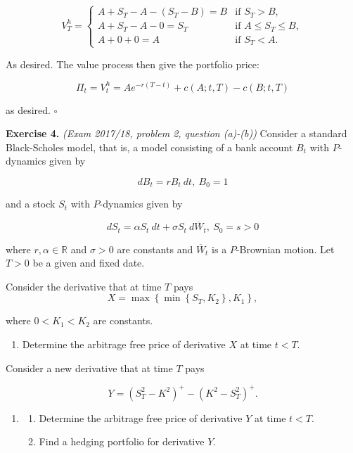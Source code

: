 \documentclass[
]{book}
\providecommand{\tightlist}{%
  \setlength{\itemsep}{0pt}\setlength{\parskip}{0pt}}
\begin{document}
\[
V_T^h=
\begin{cases}
  A+S_T-A-(S_T-B)=B & \text{if }S_T>B,\\
  A + S_T - A-0=S_T& \text{if }A\le S_T\le B,\\
  A+0+0=A &\text{if }S_T< A.
\end{cases}
\]

As desired. The value process then give the portfolio price:

\[
\Pi_t=V_t^h=Ae^{-r(T-t)}+c(A;t,T)-c(B;t,T)
\]

as desired. \(\square\)

\textbf{Exercise 4.} \emph{(Exam 2017/18, problem 2, question (a)-(b))} Consider a standard Black-Scholes model, that is, a model consisting of a bank account \(B_t\) with \(P\)-dynamics given by

\[
dB_t=rB_t\ dt,\ B_0=1
\]

and a stock \(S_t\) with \(P\)-dynamics given by

\[
dS_t=\alpha S_t\ dt+\sigma S_t\ d\overline{W}_t,\ S_0=s>0
\]

where \(r,\alpha\in\mathbb{R}\) and \(\sigma >0\) are constants and \(\overline{W}_t\) is a \(P\)-Brownian motion. Let \(T>0\) be a given and fixed date.

Consider the derivative that at time \(T\) pays
\[
X=\max\left\{\min\left\{S_T,K_2\right\},K_1\right\},
\]

where \(0<K_1<K_2\) are constants.

\begin{enumerate}
\def\labelenumi{\alph{enumi}.}
\tightlist
\item
  Determine the arbitrage free price of derivative \(X\) at time \(t<T\).
\end{enumerate}

Consider a new derivative that at time \(T\) pays

\[
Y=(S^2_T-K^2)^+-(K^2-S^2_T)^+.
\]

\begin{enumerate}
\def\labelenumi{\alph{enumi}.}
\setcounter{enumi}{1}
\item
  \begin{enumerate}
  \def\labelenumii{\roman{enumii}.}
  \tightlist
  \item
    Determine the arbitrage free price of derivative \(Y\) at time \(t<T\).
  \item
    Find a hedging portfolio for derivative \(Y\).
  \end{enumerate}
\end{enumerate}
\end{document}

